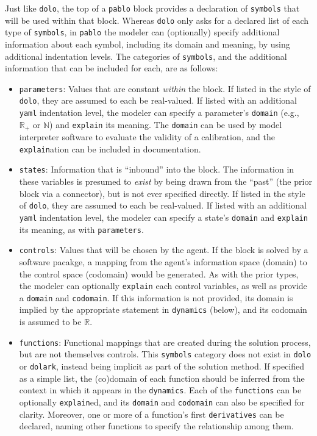 \documentclass[12pt,pdftex,letterpaper]{article}
\newcommand{\N}{\mathbb{N}}
\newcommand{\R}{\mathbb{R}}
\begin{document}
Just like \texttt{dolo}, the top of a \texttt{pablo} block provides a declaration of \texttt{symbols} that will be used within that block. Whereas \texttt{dolo} only asks for a declared list of each type of \texttt{symbols}, in \texttt{pablo} the modeler can (optionally) specify additional information about each symbol, including its domain and meaning, by using additional indentation levels. The categories of \texttt{symbols}, and the additional information that can be included for each, are as follows:
\begin{itemize}
	\item \texttt{parameters}: Values that are constant \textit{within} the block. If listed in the style of \texttt{dolo}, they are assumed to each be real-valued. If listed with an additional \texttt{yaml} indentation level, the modeler can specify a parameter's \texttt{domain} (e.g., $\R_+$ or $\N$) and \texttt{explain} its meaning. The \texttt{domain} can be used by model interpreter software to evaluate the validity of a calibration, and the \texttt{explain}ation can be included in documentation.
	
	\item \texttt{states}: Information that is ``inbound'' into the block. The information in these variables is presumed to \textit{exist} by being drawn from the ``past'' (the prior block via a connector), but is not ever specified directly. If listed in the style of \texttt{dolo}, they are assumed to each be real-valued. If listed with an additional \texttt{yaml} indentation level, the modeler can specify a state's \texttt{domain} and \texttt{explain} its meaning, as with \texttt{parameters}.
	
	\item \texttt{controls}: Values that will be chosen by the agent. If the block is solved by a software pacakge, a mapping from the agent's information space (domain) to the control space (codomain) would be generated. As with the prior types, the modeler can optionally \texttt{explain} each control variables, as well as provide a \texttt{domain} and \texttt{codomain}. If this information is not provided, its domain is implied by the appropriate statement in \texttt{dynamics} (below), and its codomain is assumed to be $\R$.
	
	\item \texttt{functions}: Functional mappings that are created during the solution process, but are not themselves controls. This \texttt{symbols} category does not exist in \texttt{dolo} or \texttt{dolark}, instead being implicit as part of the solution method. If specified as a simple list, the (co)domain of each function should be inferred from the context in which it appears in the \texttt{dynamics}. Each of the \texttt{functions} can be optionally \texttt{explain}ed, and its \texttt{domain} and \texttt{codomain} can also be specified for clarity. Moreover, one or more of a function's first \texttt{derivatives} can be declared, naming other functions to specify the relationship among them.
	

\end{itemize}
\end{document}
